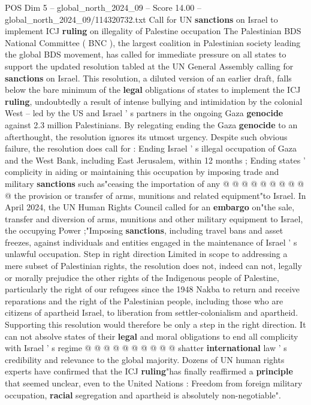 \begin{textsample}{POS Dim 5 – global\_north\_2024\_09 – Score 14.00 – global\_north\_2024\_09/114320732.txt}  \label{ex:f5_pos_357}
Call for UN \textbf{sanctions} on Israel to implement ICJ \textbf{ruling} on illegality of Palestine occupation The Palestinian BDS National Committee ( BNC ), the largest coalition in Palestinian society leading the global BDS movement, has called for immediate pressure on all states to support the updated resolution tabled at the UN General Assembly calling for \textbf{sanctions} on Israel.
This resolution, a diluted version of an earlier draft, falls below the bare minimum of the \textbf{legal} obligations of states to implement the ICJ \textbf{ruling}, undoubtedly a result of intense bullying and intimidation by the colonial West -- led by the US and Israel ' s partners in the ongoing Gaza \textbf{genocide} against 2.3 million Palestinians.
By relegating ending the Gaza \textbf{genocide} to an afterthought, the resolution ignores its utmost urgency.
Despite such obvious failure, the resolution does call for : Ending Israel ' s illegal occupation of Gaza and the West Bank, including East Jerusalem, within 12 months ; Ending states ' complicity in aiding or maintaining this occupation by imposing trade and military \textbf{sanctions} such as"ceasing the importation of any @ @ @ @ @ @ @ @ @ @ the provision or transfer of arms, munitions and related equipment"to Israel.
In April 2024, the UN Human Rights Council called for an \textbf{embargo} on"the sale, transfer and diversion of arms, munitions and other military equipment to Israel, the occupying Power ;"Imposing \textbf{sanctions}, including travel bans and asset freezes, against individuals and entities engaged in the maintenance of Israel ' s unlawful occupation.
Step in right direction Limited in scope to addressing a mere subset of Palestinian rights, the resolution does not, indeed can not, legally or morally prejudice the other rights of the Indigenous people of Palestine, particularly the right of our refugees since the 1948 Nakba to return and receive reparations and the right of the Palestinian people, including those who are citizens of apartheid Israel, to liberation from settler-colonialism and apartheid.
Supporting this resolution would therefore be only a step in the right direction.
It can not absolve states of their \textbf{legal} and moral obligations to end all complicity with Israel ' s regime @ @ @ @ @ @ @ @ @ @ shatter \textbf{international} law ' s credibility and relevance to the global majority.
Dozens of UN human rights experts have confirmed that the ICJ \textbf{ruling}"has finally reaffirmed a \textbf{principle} that seemed unclear, even to the United Nations : Freedom from foreign military occupation, \textbf{racial} segregation and apartheid is absolutely non-negotiable".

\end{textsample}

